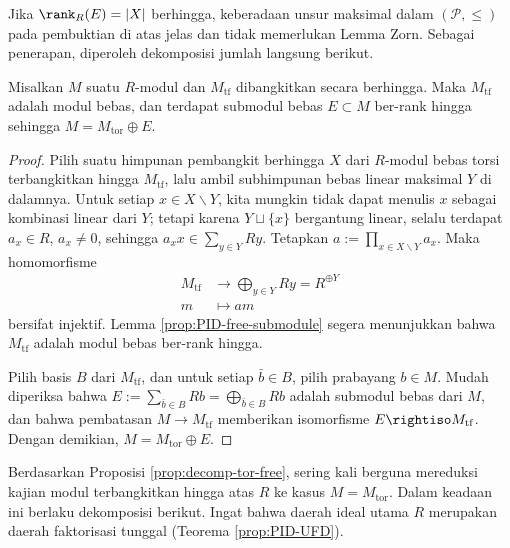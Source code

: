 Jika $\rank_R(E) = |X|$ berhingga, keberadaan unsur maksimal dalam $(\mathcal{P}, \leq)$ pada pembuktian di atas jelas dan tidak memerlukan Lemma Zorn. Sebagai penerapan, diperoleh dekomposisi jumlah langsung berikut.

\begin{proposition}\label{prop:decomp-tor-free}
	Misalkan $M$ suatu $R$-modul dan $M_\text{tf}$ dibangkitkan secara berhingga. Maka $M_\text{tf}$ adalah modul bebas, dan terdapat submodul bebas $E \subset M$ ber-rank hingga sehingga $M = M_\text{tor} \oplus E$.
\end{proposition}
\begin{proof}
	Pilih suatu himpunan pembangkit berhingga $X$ dari $R$-modul bebas torsi terbangkitkan hingga $M_\text{tf}$, lalu ambil subhimpunan bebas linear maksimal $Y$ di dalamnya. Untuk setiap $x \in X \smallsetminus Y$, kita mungkin tidak dapat menulis $x$ sebagai kombinasi linear dari $Y$; tetapi karena $Y \sqcup \{x\}$ bergantung linear, selalu terdapat $a_x \in R$, $a_x \neq 0$, sehingga $a_x x \in \sum_{y \in Y} Ry$. Tetapkan $a := \prod_{x \in X \smallsetminus Y} a_x$. Maka homomorfisme
	\begin{align*}
		M_\text{tf} & \longrightarrow \bigoplus_{y \in Y} Ry = R^{\oplus Y} \\
		m & \longmapsto am
	\end{align*}
	bersifat injektif. Lemma \ref{prop:PID-free-submodule} segera menunjukkan bahwa $M_\text{tf}$ adalah modul bebas ber-rank hingga.

	Pilih basis $B$ dari $M_\text{tf}$, dan untuk setiap $\bar{b} \in B$, pilih prabayang $b \in M$. Mudah diperiksa bahwa $E := \sum_{\bar{b} \in B} Rb = \bigoplus_{\bar{b} \in B} Rb$ adalah submodul bebas dari $M$, dan bahwa pembatasan $M \to M_\text{tf}$ memberikan isomorfisme $E \rightiso M_\text{tf}$. Dengan demikian, $M = M_\text{tor} \oplus E$.
\end{proof}

Berdasarkan Proposisi \ref{prop:decomp-tor-free}, sering kali berguna mereduksi kajian modul terbangkitkan hingga atas $R$ ke kasus $M = M_\text{tor}$. Dalam keadaan ini berlaku dekomposisi berikut. Ingat bahwa daerah ideal utama $R$ merupakan daerah faktorisasi tunggal (Teorema \ref{prop:PID-UFD}).

